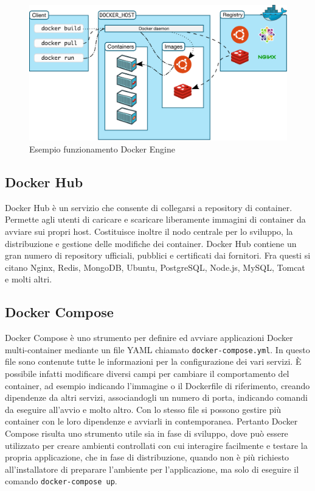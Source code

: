 \begin{figure}[h]
    \centering
    \includegraphics[scale=0.3]{immagini/architecture.png}
    \caption{Esempio funzionamento Docker Engine}
    \label{fig:docker-architecture-example}
\end{figure}

\subsection{Docker Hub}\label{docker-hub}
Docker Hub è un servizio che consente di collegarsi a repository di container. Permette agli utenti di caricare e scaricare liberamente immagini di container da avviare sui propri host. Costituisce inoltre il nodo centrale per lo sviluppo, la distribuzione e gestione delle modifiche dei container. Docker Hub contiene un gran numero di repository ufficiali, pubblici e certificati dai fornitori. Fra questi si citano Nginx, Redis, MongoDB, Ubuntu, PostgreSQL, Node.js, MySQL, Tomcat e molti altri.

\subsection{Docker Compose}
Docker Compose è uno strumento per definire ed avviare applicazioni Docker multi-container mediante un file YAML chiamato \verb|docker-compose.yml|. In questo file sono contenute tutte le informazioni per la configurazione dei vari servizi. È possibile infatti modificare diversi campi per cambiare il comportamento del container, ad esempio indicando l'immagine o il Dockerfile di riferimento, creando dipendenze da altri servizi, associandogli un numero di porta, indicando comandi da eseguire all'avvio e molto altro. Con lo stesso file si possono gestire più container con le loro dipendenze e avviarli in contemporanea. Pertanto Docker Compose risulta uno strumento utile sia in fase di sviluppo, dove può essere utilizzato per creare ambienti controllati con cui interagire facilmente e testare la propria applicazione, che in fase di distribuzione, quando non è più richiesto all'installatore di preparare l'ambiente per l'applicazione, ma solo di eseguire il comando \verb|docker-compose up|.

